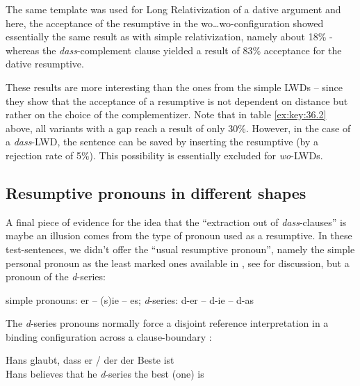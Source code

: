 \documentclass[output=paper]{langsci/langscibook}
\begin{document}
The same template was used for Long Relativization of a dative argument and
here, the acceptance of the resumptive in the wo\dots{}wo-configuration showed
essentially the same result as with simple relativization, namely about 18\% -
whereas the \emph{dass}-complement clause yielded a result of 83\% acceptance
for the dative resumptive.

These results are more interesting than the ones from the simple \glspl{LWD} – since
they show that the acceptance of a resumptive is not dependent on distance but
rather on the choice of the complementizer. Note that in table \eqref{ex:key:36.2}
above, all variants with a gap reach a result of only 30\%. However, in the
case of a \emph{dass}-\gls{LWD}, the sentence can be saved by inserting the
resumptive (by a rejection rate of 5\%). This possibility is essentially
excluded for \emph{wo}-\glspl{LWD}.

\subsection{Resumptive pronouns in different shapes}\label{sub:36.3.4} %

A final piece of evidence for the idea that the \enquote{extraction out of
    \emph{dass}-clauses} is maybe an illusion comes from the type of pronoun
    used as a resumptive. In these test-sentences, we didn’t offer the
    \enquote{usual resumptive pronoun}, namely the simple personal pronoun as
    the least marked ones available in , see \citet{Adger2011}
    for discussion, but a pronoun of the \emph{d}-series:

\ea
    simple pronouns: er -- (s)ie -- es; \emph{d}-series: d-er – d-ie – d-as
\z

The \emph{d}-series pronouns normally force a disjoint reference interpretation in a
binding configuration across a clause-boundary \parencite{Wiltschko1998}:

\ea\label{ex:key:36.17} 
    \gll Hans glaubt, dass er / der der Beste ist\\
    Hans believes that he {} \emph{d}-series the best (one) is\\
\z
\end{document}
